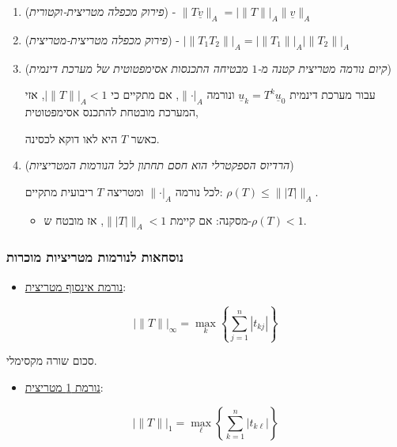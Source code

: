 \documentclass[11pt]{article}
\begin{document}
\begin{enumerate}
\item (\emph{פירוק מכפלה מטריצית-וקטורית}) - \(\|T \underline{v}\|_A = \left|\|  T \|\right|_A \|\underline{v}\|_{A}\)

\item (\emph{פירוק מכפלה מטריצית-מטריצית}) - \(\left| \|T_1T_2\| \right|_A = \left| \|T_1\| \right|_A \left| \|T_2\| \right|_{A}\)

\item (\emph{קיום נורמה מטריצית קטנה מ-\(1\) מבטיחה התכנסות אסימפטוטית של מערכת דינמית})

עבור מערכת דינמית \(\underline{u}_k = T^k\underline{u}_0\) ונורמה \(\|\mathord{\cdot}|_{A}\), אם מתקיים כי \(\left| \|T\| \right|_A < 1\), אזי המערכת מובטחת להתכנס אסימפטוטית,

כאשר \(T\) היא לאו דוקא לכסינה.

\item (\emph{הרדיוס הספקטרלי הוא חסם תחתון לכל הנורמות המטריציות})

לכל נורמה \(\|\mathord{\cdot}|_{A}\) ומטריצה \(T\) ריבועית מתקיים: \(\rho \left( T \right) \le \| \left| T \right|\|_A\).

\begin{itemize}
\item מסקנה: אם קיימת \(\| \left| T \right|\|_A < 1\), אז מובטח ש-\(\rho \left( T \right) < 1\).
\end{itemize}
\end{enumerate}

\subsubsection{נוסחאות לנורמות מטריציות מוכרות}
\label{sec:org3f97417}

\begin{itemize}
\item \uline{נורמת אינסוף מטריצית}:
\end{itemize}

\[
\left| \|T\| \right|_{\infty} = \max_k \left\{ \sum_{j=1}^{n} \left| t_{kj} \right| \right\}
\]

סכום שורה מקסימלי.

\begin{itemize}
\item \uline{נורמת 1 מטריצית}:
\end{itemize}

\[
\left| \|T\| \right|_1
=
\max_{\ell} \left\{ \sum_{k=1}^{n} \left| t_{k\ell} \right| \right\}
\]
\end{document}
